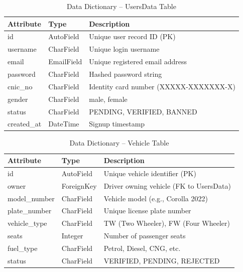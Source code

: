 \begin{table}[H]
\centering
\caption{Data Dictionary – UsersData Table}
\renewcommand{\arraystretch}{1.5}
\begin{tabular}{|p{3cm}|p{3.5cm}|p{6.5cm}|}
\hline
\textbf{Attribute} & \textbf{Type} & \textbf{Description} \\
\hline
id & AutoField & Unique user record ID (PK) \\
\hline
username & CharField & Unique login username \\
\hline
email & EmailField & Unique registered email address \\
\hline
password & CharField & Hashed password string \\
\hline
cnic\_no & CharField & Identity card number (XXXXX-XXXXXXX-X) \\
\hline
gender & CharField & male, female \\
\hline
status & CharField & PENDING, VERIFIED, BANNED \\
\hline
created\_at & DateTime & Signup timestamp \\
\hline
\end{tabular}
\end{table}

\begin{table}[H]
\centering
\caption{Data Dictionary – Vehicle Table}
\renewcommand{\arraystretch}{1.5}
\begin{tabular}{|p{3cm}|p{3cm}|p{7cm}|}
\hline
\textbf{Attribute} & \textbf{Type} & \textbf{Description} \\
\hline
id & AutoField & Unique vehicle identifier (PK) \\
\hline
owner & ForeignKey & Driver owning vehicle (FK to UsersData) \\
\hline
model\_number & CharField & Vehicle model (e.g., Corolla 2022) \\
\hline
plate\_number & CharField & Unique license plate number \\
\hline
vehicle\_type & CharField & TW (Two Wheeler), FW (Four Wheeler) \\
\hline
seats & Integer & Number of passenger seats \\
\hline
fuel\_type & CharField & Petrol, Diesel, CNG, etc. \\
\hline
status & CharField & VERIFIED, PENDING, REJECTED \\
\hline
\end{tabular}
\end{table}

